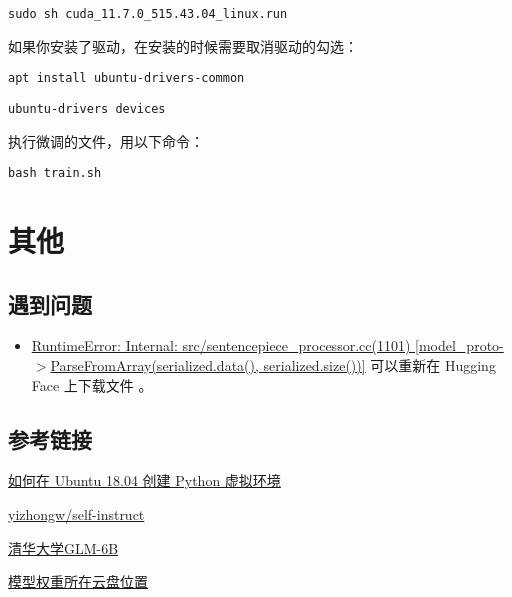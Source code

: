 \documentclass{article}
\begin{document}
\verb|sudo sh cuda_11.7.0_515.43.04_linux.run|

如果你安装了驱动，在安装的时候需要取消驱动的勾选：

\verb|apt install ubuntu-drivers-common|

\verb|ubuntu-drivers devices|

执行微调的文件，用以下命令：

\verb|bash train.sh|

\section{其他}
\subsection{遇到问题}
\begin{itemize}
    \item \href{https://github.com/THUDM/ChatGLM2-6B/issues/21}{RuntimeError: Internal: src/sentencepiece\_processor.cc(1101) [model\_proto-$>$ParseFromArray(serialized.data(), serialized.size())]} 可以重新在 Hugging Face 上下载文件 。
\end{itemize}
\subsection{参考链接}
\href{https://www.myfreax.com/how-to-create-python-virtual-environments-on-ubuntu-18-04/}{如何在 Ubuntu 18.04 创建 Python 虚拟环境}

\href{https://github.com/yizhongw/self-instruct/blob/main/human_eval/README.md}{yizhongw/self-instruct}

\href{https://github.com/THUDM/ChatGLM-6B}{清华大学GLM-6B}

\href{https://cloud.tsinghua.edu.cn/d/fb9f16d6dc8f482596c2/}{模型权重所在云盘位置}
\end{document}
